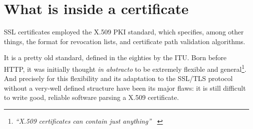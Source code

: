 \vfill
\section{What is inside a certificate \label{sec:ssl:x509}}
SSL certificates employed the X.509 PKI standard, which specifies, among other
things, the format for revocation lists, and certificate path validation
algorithms.
\\
\begin{center}
\end{center}

It is a pretty old standard, defined in the eighties by the ITU.
Born before HTTP, it was initially thought \emph{in abstracto} to be
extremely flexible and general\footnote{
  \textit{``X.509 certificates can contain just anything''} ~\cite{SSLiverse}
}.
And precisely for this flexibility and its adaptation to the SSL/TLS protocol
without a very-well defined structure have been its major flaws: it is still
difficult to write good, reliable software parsing a X.509 certificate.

